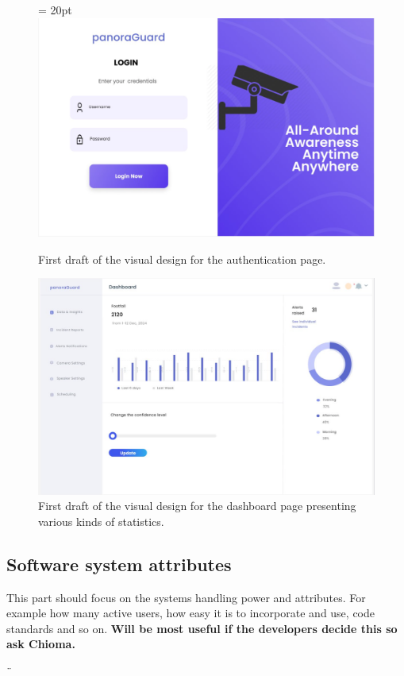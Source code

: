 \documentclass{article}
\begin{document}
\begin{figure}[H]
    \centering
    \topmargin = 20pt
\includegraphics[width=0.75\linewidth]{authenticationPageFirstDesignDraft.png}

    \caption[width=0.75]{First draft of the visual design for the authentication page.
    }
    
    \label{fig:authenticationPageFirstDraft}

    \includegraphics[width=0.75\linewidth]{dashboardFirstDesignDraft.png}
    \caption[width=0.75]{First draft of the visual design for the dashboard page presenting various kinds of statistics.}
    \label{fig:dashboardPageFirstDraft}
\end{figure}


\subsection{Software system attributes}
This part should focus on the systems handling power and attributes. For example how many active users, how easy it is to incorporate and use, code standards and so on. \textbf{Will be most useful if the developers decide this so ask Chioma.} 


\newpage
¨%


\newpage
\printbibliography
\end{document}
